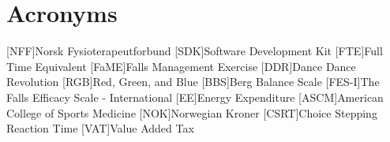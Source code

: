 \chapter*{Acronyms}
\begin{acronym}
[NFF]{Norsk Fysioterapeutforbund}
[SDK]{Software Development Kit}
[FTE]{Full Time Equivalent}
[FaME]{Falls Management Exercise}
[DDR]{Dance Dance Revolution}
[RGB]{Red, Green, and Blue}
[BBS]{Berg Balance Scale}
[FES-I]{The Falls Efficacy Scale - International}
[EE]{Energy Expenditure} 
[ASCM]{American College of Sports Medicine} 
[NOK]{Norwegian Kroner} 
[CSRT]{Choice Stepping Reaction Time} 
[VAT]{Value Added Tax} 
\end{acronym}

